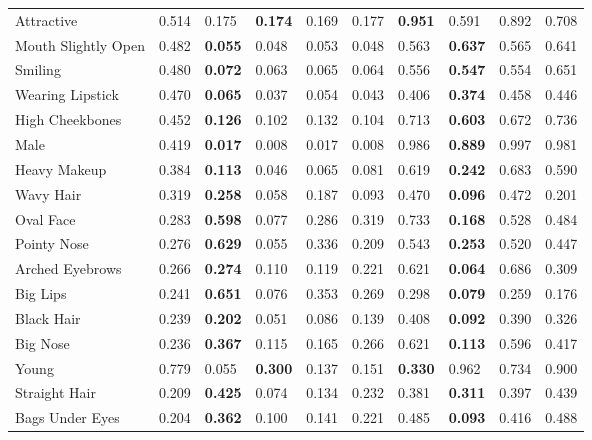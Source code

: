 \begin{tabular}{lrllrrllrr}
\hline
 Attractive          & 0.514 & 0.175     & \bf 0.174 & 0.169 & 0.177 & \bf 0.951 & 0.591     & 0.892 & 0.708 \\
 Mouth Slightly Open & 0.482 & \bf 0.055 & 0.048     & 0.053 & 0.048 & 0.563     & \bf 0.637 & 0.565 & 0.641 \\
 Smiling             & 0.480 & \bf 0.072 & 0.063     & 0.065 & 0.064 & 0.556     & \bf 0.547 & 0.554 & 0.651 \\
 Wearing Lipstick    & 0.470 & \bf 0.065 & 0.037     & 0.054 & 0.043 & 0.406     & \bf 0.374 & 0.458 & 0.446 \\
 High Cheekbones     & 0.452 & \bf 0.126 & 0.102     & 0.132 & 0.104 & 0.713     & \bf 0.603 & 0.672 & 0.736 \\
 Male                & 0.419 & \bf 0.017 & 0.008     & 0.017 & 0.008 & 0.986     & \bf 0.889 & 0.997 & 0.981 \\
 Heavy Makeup        & 0.384 & \bf 0.113 & 0.046     & 0.065 & 0.081 & 0.619     & \bf 0.242 & 0.683 & 0.590 \\
 Wavy Hair           & 0.319 & \bf 0.258 & 0.058     & 0.187 & 0.093 & 0.470     & \bf 0.096 & 0.472 & 0.201 \\
 Oval Face           & 0.283 & \bf 0.598 & 0.077     & 0.286 & 0.319 & 0.733     & \bf 0.168 & 0.528 & 0.484 \\
 Pointy Nose         & 0.276 & \bf 0.629 & 0.055     & 0.336 & 0.209 & 0.543     & \bf 0.253 & 0.520 & 0.447 \\
 Arched Eyebrows     & 0.266 & \bf 0.274 & 0.110     & 0.119 & 0.221 & 0.621     & \bf 0.064 & 0.686 & 0.309 \\
 Big Lips            & 0.241 & \bf 0.651 & 0.076     & 0.353 & 0.269 & 0.298     & \bf 0.079 & 0.259 & 0.176 \\
 Black Hair          & 0.239 & \bf 0.202 & 0.051     & 0.086 & 0.139 & 0.408     & \bf 0.092 & 0.390 & 0.326 \\
 Big Nose            & 0.236 & \bf 0.367 & 0.115     & 0.165 & 0.266 & 0.621     & \bf 0.113 & 0.596 & 0.417 \\
 Young               & 0.779 & 0.055     & \bf 0.300 & 0.137 & 0.151 & \bf 0.330 & 0.962     & 0.734 & 0.900 \\
 Straight Hair       & 0.209 & \bf 0.425 & 0.074     & 0.134 & 0.232 & 0.381     & \bf 0.311 & 0.397 & 0.439 \\
 Bags Under Eyes     & 0.204 & \bf 0.362 & 0.100     & 0.141 & 0.221 & 0.485     & \bf 0.093 & 0.416 & 0.488 \\

\end{tabular}
